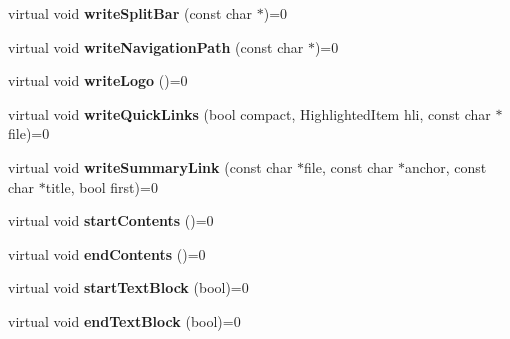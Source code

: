 \begin{DoxyCompactItemize}
\item 
\hypertarget{class_output_generator_a418ab0c46840d3efc542b734997492b1}{virtual void {\bfseries write\-Split\-Bar} (const char $\ast$)=0}\label{class_output_generator_a418ab0c46840d3efc542b734997492b1}

\item 
\hypertarget{class_output_generator_aed29914cc8bcf0c7a54fa0d338bd61ef}{virtual void {\bfseries write\-Navigation\-Path} (const char $\ast$)=0}\label{class_output_generator_aed29914cc8bcf0c7a54fa0d338bd61ef}

\item 
\hypertarget{class_output_generator_a36f3c6dc6caac24d3f980e4445d19b7e}{virtual void {\bfseries write\-Logo} ()=0}\label{class_output_generator_a36f3c6dc6caac24d3f980e4445d19b7e}

\item 
\hypertarget{class_output_generator_a996c1265b6a93b7452ab8ee8105b1840}{virtual void {\bfseries write\-Quick\-Links} (bool compact, Highlighted\-Item hli, const char $\ast$file)=0}\label{class_output_generator_a996c1265b6a93b7452ab8ee8105b1840}

\item 
\hypertarget{class_output_generator_a927ac1b98592fc45db3e35f6de9454dc}{virtual void {\bfseries write\-Summary\-Link} (const char $\ast$file, const char $\ast$anchor, const char $\ast$title, bool first)=0}\label{class_output_generator_a927ac1b98592fc45db3e35f6de9454dc}

\item 
\hypertarget{class_output_generator_a2cfbbdedde62639c38bcfd3d87ad7e58}{virtual void {\bfseries start\-Contents} ()=0}\label{class_output_generator_a2cfbbdedde62639c38bcfd3d87ad7e58}

\item 
\hypertarget{class_output_generator_a4557a724d39ab6b885ad6184fb365bce}{virtual void {\bfseries end\-Contents} ()=0}\label{class_output_generator_a4557a724d39ab6b885ad6184fb365bce}

\item 
\hypertarget{class_output_generator_a4a6465d2afbe0f569f06b46fe61a9d3b}{virtual void {\bfseries start\-Text\-Block} (bool)=0}\label{class_output_generator_a4a6465d2afbe0f569f06b46fe61a9d3b}

\item 
\hypertarget{class_output_generator_a76a29344b123d5cf9d6b3f2beda91e37}{virtual void {\bfseries end\-Text\-Block} (bool)=0}\label{class_output_generator_a76a29344b123d5cf9d6b3f2beda91e37}


\end{DoxyCompactItemize}
